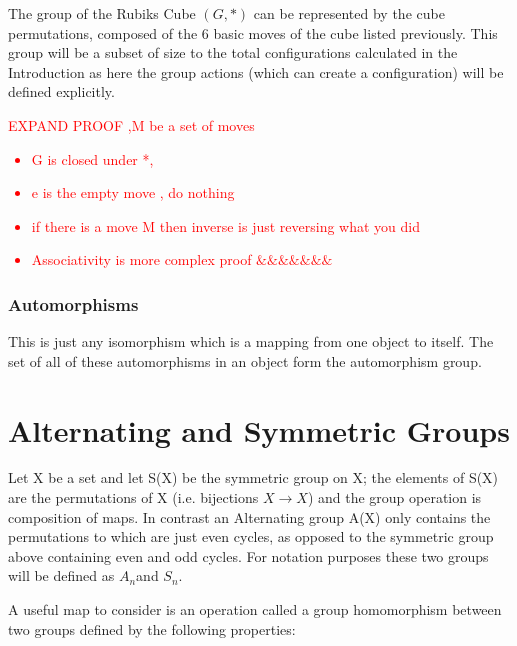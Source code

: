 \documentclass{article}
\begin{document}
The group of the Rubiks Cube $(G,*)$ can be represented by the cube permutations, composed of the 6 basic moves of the cube listed previously.  This group will be a subset of size to the total configurations calculated in the Introduction as here the group actions (which can create a configuration) will be defined explicitly.

\textcolor{red}{EXPAND PROOF ,M be a set of moves 
\begin{itemize}
\item G is closed under *, 
\item e is the empty move , do nothing
\item if there is a move M then inverse is just reversing what you did
\item Associativity is more complex proof $\&\&\&\&\&\&\&$
\end{itemize}}

\subsubsection{Automorphisms}
This is just any isomorphism which is a mapping from one object to itself. The set of all of these automorphisms in an object form the automorphism group.


\paragraph*{}
\newpage
\section{Alternating and Symmetric Groups}
Let X be a set and let S(X) be the symmetric group on X; the elements of S(X)
are the permutations of X (i.e. bijections $X\rightarrow X$) and the group operation is
composition of maps.
In contrast an Alternating group A(X) only contains the permutations to which are just even cycles, as opposed to the symmetric group above containing even and odd cycles.  For notation purposes these two groups will be defined as $A_{n} $and $S_{n}$. 



A useful map to consider is an operation called a group homomorphism between two groups defined by the following properties:
\end{document}
